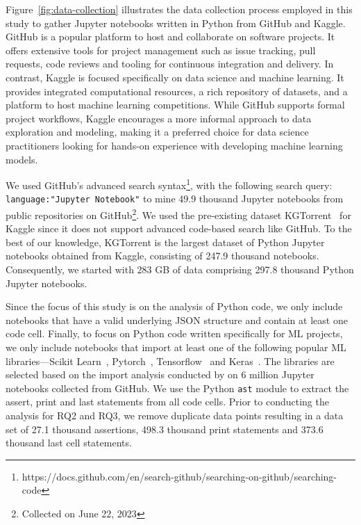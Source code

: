 \documentclass[smallextended]{svjour3}       %
\begin{document}
Figure~\ref{fig:data-collection} illustrates the data collection process employed in this study to gather Jupyter notebooks written in Python from GitHub and Kaggle. GitHub is a popular platform to host and collaborate on software projects. It offers extensive tools for project management such as issue tracking, pull requests, code reviews and tooling for continuous integration and delivery. In contrast, Kaggle is focused specifically on data science and machine learning. It provides integrated computational resources, a rich repository of datasets, and a platform to host machine learning competitions. While GitHub supports formal project workflows, Kaggle encourages a more informal approach to data exploration and modeling, making it a preferred choice for data science practitioners looking for hands-on experience with developing machine learning models.

We used GitHub's advanced search syntax\footnote{https://docs.github.com/en/search-github/searching-on-github/searching-code}, with the following search query: \lstinline[language={}]$language:"Jupyter Notebook"$ to mine 49.9 thousand Jupyter notebooks from public repositories on GitHub\footnote{Collected on June 22, 2023}. We used the pre-existing dataset KGTorrent~\citep{quaranta2021kgtorrent} for Kaggle since it does not support advanced code-based search like GitHub. To the best of our knowledge, KGTorrent is the largest dataset of Python Jupyter notebooks obtained from Kaggle, consisting of 247.9 thousand notebooks. Consequently, we started with 283 GB of data comprising 297.8 thousand Python Jupyter notebooks.

Since the focus of this study is on the analysis of Python code, we only include notebooks that have a valid underlying JSON structure and contain at least one code cell. Finally, to focus on Python code written specifically for ML projects, we only include notebooks that import at least one of the following popular ML libraries---Scikit Learn~\citep{pedregosa2011scikit-learn}, Pytorch~\citep{paszke2017automatic}, Tensorflow~\citep{abadi2015tensorflow} and Keras~\citep{chollet2015keras}. The libraries are selected based on the import analysis conducted by \citet{psallidas2019data} on 6 million Jupyter notebooks collected from GitHub. We use the Python \lstinline{ast} module to extract the assert, print and last statements from all code cells. Prior to conducting the analysis for RQ2 and RQ3, we remove duplicate data points resulting in a data set of 27.1 thousand assertions, 498.3 thousand print statements and 373.6 thousand last cell statements.
\end{document}
